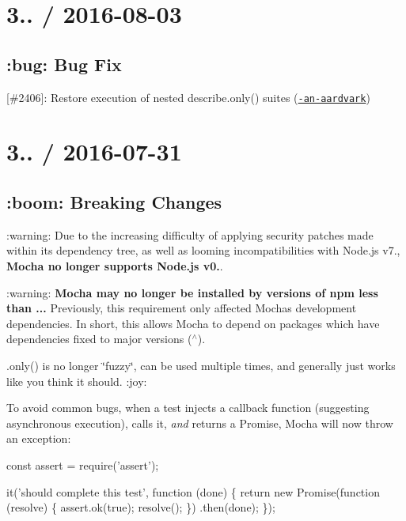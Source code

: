 \section*{3.. / 2016-\/08-\/03}

\subsection*{\+:bug\+: Bug Fix}


\begin{DoxyItemize}
\item \mbox{[}\#2406\mbox{]}\+: Restore execution of nested {\ttfamily describe.\+only()} suites (\href{https://github.com/not-an-aardvark}{\tt -\/an-\/aardvark})
\end{DoxyItemize}

\section*{3.. / 2016-\/07-\/31}

\subsection*{\+:boom\+: Breaking Changes}


\begin{DoxyItemize}
\item \+:warning\+: Due to the increasing difficulty of applying security patches made within its dependency tree, as well as looming incompatibilities with Node.\+js v7., {\bfseries Mocha no longer supports Node.\+js v0.}.
\item \+:warning\+: {\bfseries Mocha may no longer be installed by versions of {\ttfamily npm} less than {..}.} Previously, this requirement only affected Mocha\textquotesingle{}s development dependencies. In short, this allows Mocha to depend on packages which have dependencies fixed to major versions ({\ttfamily $^\wedge$}).
\item {\ttfamily .only()} is no longer \char`\"{}fuzzy\char`\"{}, can be used multiple times, and generally just works like you think it should. \+:joy\+:
\item To avoid common bugs, when a test injects a callback function (suggesting asynchronous execution), calls it, {\itshape and} returns a {\ttfamily Promise}, Mocha will now throw an exception\+:
\end{DoxyItemize}


\begin{DoxyCode}
const assert = require('assert');

it('should complete this test', function (done) \{
  return new Promise(function (resolve) \{
    assert.ok(true);
    resolve();
  \})
    .then(done);
\});
\end{DoxyCode}


